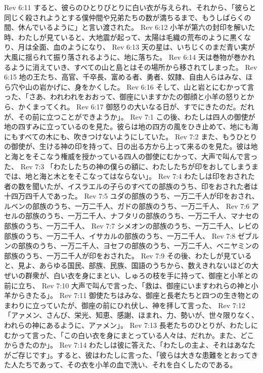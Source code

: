 Rev 6:11  すると、彼らのひとりびとりに白い衣が与えられ、それから、「彼らと同じく殺されようとする僕仲間や兄弟たちの数が満ちるまで、もうしばらくの間、休んでいるように」と言い渡された。
Rev 6:12  小羊が第六の封印を解いた時、わたしが見ていると、大地震が起って、太陽は毛織の荒布のように黒くなり、月は全面、血のようになり、
Rev 6:13  天の星は、いちじくのまだ青い実が大風に揺られて振り落されるように、地に落ちた。
Rev 6:14  天は巻物が巻かれるように消えていき、すべての山と島とはその場所から移されてしまった。
Rev 6:15  地の王たち、高官、千卒長、富める者、勇者、奴隷、自由人らはみな、ほら穴や山の岩かげに、身をかくした。
Rev 6:16  そして、山と岩とにむかって言った、「さあ、われわれをおおって、御座にいますかたの御顔と小羊の怒りとから、かくまってくれ。
Rev 6:17  御怒りの大いなる日が、すでにきたのだ。だれが、その前に立つことができようか」。
Rev 7:1  この後、わたしは四人の御使が地の四すみに立っているのを見た。彼らは地の四方の風をひき止めて、地にも海にもすべての木にも、吹きつけないようにしていた。
Rev 7:2  また、もうひとりの御使が、生ける神の印を持って、日の出る方から上って来るのを見た。彼は地と海とをそこなう権威を授かっている四人の御使にむかって、大声で叫んで言った、
Rev 7:3  「わたしたちの神の僕らの額に、わたしたちが印をおしてしまうまでは、地と海と木とをそこなってはならない」。
Rev 7:4  わたしは印をおされた者の数を聞いたが、イスラエルの子らのすべての部族のうち、印をおされた者は十四万四千人であった。
Rev 7:5  ユダの部族のうち、一万二千人が印をおされ、ルベンの部族のうち、一万二千人、ガドの部族のうち、一万二千人、
Rev 7:6  アセルの部族のうち、一万二千人、ナフタリの部族のうち、一万二千人、マナセの部族のうち、一万二千人、
Rev 7:7  シメオンの部族のうち、一万二千人、レビの部族のうち、一万二千人、イサカルの部族のうち、一万二千人、
Rev 7:8  ゼブルンの部族のうち、一万二千人、ヨセフの部族のうち、一万二千人、ベニヤミンの部族のうち、一万二千人が印をおされた。
Rev 7:9  その後、わたしが見ていると、見よ、あらゆる国民、部族、民族、国語のうちから、数えきれないほどの大ぜいの群衆が、白い衣を身にまとい、しゅろの枝を手に持って、御座と小羊との前に立ち、
Rev 7:10  大声で叫んで言った、「救は、御座にいますわれらの神と小羊からきたる」。
Rev 7:11  御使たちはみな、御座と長老たちと四つの生き物とのまわりに立っていたが、御座の前にひれ伏し、神を拝して言った、
Rev 7:12  「アァメン、さんび、栄光、知恵、感謝、ほまれ、力、勢いが、世々限りなく、われらの神にあるように、アァメン」。
Rev 7:13  長老たちのひとりが、わたしにむかって言った、「この白い衣を身にまとっている人々は、だれか。また、どこからきたのか」。
Rev 7:14  わたしは彼に答えた、「わたしの主よ、それはあなたがご存じです」。すると、彼はわたしに言った、「彼らは大きな患難をとおってきた人たちであって、その衣を小羊の血で洗い、それを白くしたのである。
